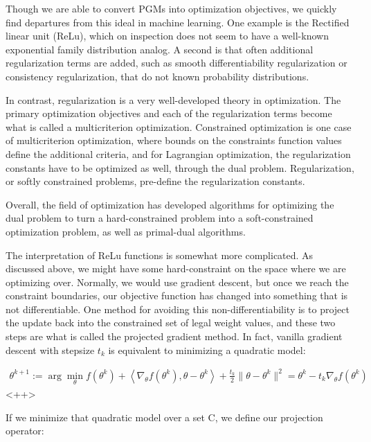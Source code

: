 \documentclass[a4paper]{article}
\begin{document}
Though we are able to convert PGMs into optimization objectives, we quickly find departures from this ideal in machine learning. 
One example is the Rectified linear unit (ReLu), which on inspection does not seem to have a well-known exponential family distribution analog. 
A second is that often additional regularization terms are added, such as smooth differentiability regularization or consistency regularization, that do not known probability distributions. 

In contrast, regularization is a very well-developed theory in optimization. 
The primary optimization objectives and each of the regularization terms become what is called a multicriterion optimization. 
Constrained optimization is one case of multicriterion optimization, where bounds on the constraints function values define the additional criteria, and for Lagrangian optimization, the regularization constants have to be optimized as well, through the dual problem. 
Regularization, or softly constrained problems, pre-define the regularization constants.

Overall, the field of optimization has developed algorithms for optimizing the dual problem to turn a hard-constrained problem into a soft-constrained optimization problem, as well as primal-dual algorithms. 

The interpretation of ReLu functions is somewhat more complicated. 
As discussed above, we might have some hard-constraint on the space where we are optimizing over. 
Normally, we would use gradient descent, but once we reach the constraint boundaries, our objective function has changed into something that is not differentiable. 
One method for avoiding this non-differentiability is to project the update back into the constrained set of legal weight values, and these two steps are what is called the projected gradient method. 
In fact, vanilla gradient descent with stepsize $t_k$ is equivalent to minimizing a quadratic model:

\begin{equation}
  \begin{split}
    \theta^{k+1} := \arg \min_{\theta} f(\theta^k) + \left< \nabla_{\theta} f(\theta^k), \theta-\theta^k \right> + \frac{t_k}{2} \lVert \theta - \theta^k \rVert^2
    = \theta^k - t_k \nabla_{\theta} f(\theta^k)
  \end{split}
  \label{<++>}
\end{equation}<++>

If we minimize that quadratic model over a set C, we define our projection operator:
\end{document}
